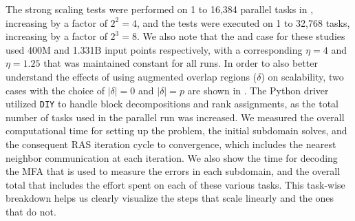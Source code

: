 
The strong scaling tests were performed on 1 to 16,384 parallel tasks in , increasing by a factor of $2^2=4$, and the  tests were executed on 1 to 32,768 tasks, increasing by a factor of $2^3=8$. We also note that the  and  case for these studies used 400M and 1.331B input points respectively, with a corresponding $\eta=4$ and $\eta=1.25$ that was maintained constant for all runs. 
In order to also better understand the effects of using augmented overlap regions ($\delta$) on scalability, two cases with the choice of $\left| \delta \right|=0$ and $\left| \delta \right|=p$ are shown in . 
%
%
The Python driver utilized \texttt{DIY} to handle block decompositions and rank assignments, as the total number of tasks used in the parallel run was increased. We measured the overall computational time for setting up the problem, the initial subdomain solves, and the consequent RAS iteration cycle to convergence, which includes the nearest neighbor communication at each iteration. We also show the time for decoding the MFA that is used to measure the errors in each subdomain, and the overall total that includes the effort spent on each of these various tasks. This task-wise breakdown helps us clearly visualize the steps that scale linearly and the ones that do not.





